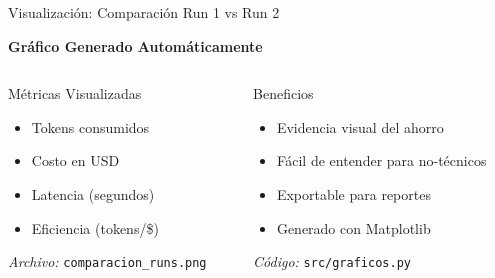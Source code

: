 \documentclass[aspectratio=169,11pt]{beamer}
\begin{document}
\begin{frame}{Visualización: Comparación Run 1 vs Run 2}
\begin{center}
\textbf{Gráfico Generado Automáticamente}
\end{center}

\vspace{0.3cm}

\begin{columns}[T]
\begin{column}{0.48\textwidth}
\begin{block}{Métricas Visualizadas}
\begin{itemize}
    \item Tokens consumidos
    \item Costo en USD
    \item Latencia (segundos)
    \item Eficiencia (tokens/\$)
\end{itemize}
\end{block}

\vspace{0.3cm}

\footnotesize
\textit{Archivo:} \texttt{comparacion\_runs.png}
\end{column}

\begin{column}{0.48\textwidth}
\begin{exampleblock}{Beneficios}
\begin{itemize}
    \item Evidencia visual del ahorro
    \item Fácil de entender para no-técnicos
    \item Exportable para reportes
    \item Generado con Matplotlib
\end{itemize}
\end{exampleblock}

\vspace{0.3cm}

\footnotesize
\textit{Código:} \texttt{src/graficos.py}
\end{column}
\end{columns}
\end{frame}
\end{document}
